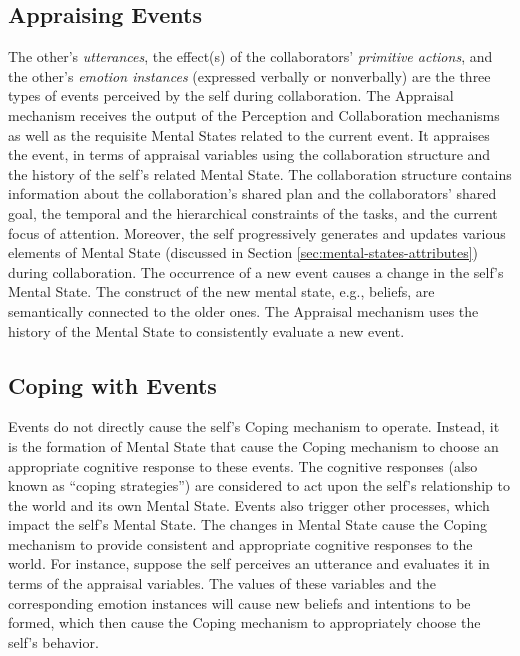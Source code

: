 \documentclass[12pt]{report}
\begin{document}
\subsection{Appraising Events}
\label{sec:appraisal-event}

The other's \textit{utterances}, the effect(s) of the collaborators'
\textit{primitive actions}, and the other's \textit{emotion instances}
(expressed verbally or nonverbally) are the three types of events perceived by
the self during collaboration. The Appraisal mechanism receives the output of
the Perception and Collaboration mechanisms as well as the requisite Mental
States related to the current event. It appraises the event, in terms of
appraisal variables using the collaboration structure and the history of the
self's related Mental State. The collaboration structure contains information
about the collaboration's shared plan and the collaborators' shared goal, the
temporal and the hierarchical constraints of the tasks, and the current focus of
attention. Moreover, the self progressively generates and updates various
elements of Mental State (discussed in Section
\ref{sec:mental-states-attributes}) during collaboration. The occurrence of a
new event causes a change in the self's Mental State. The construct of the new
mental state, e.g., beliefs, are semantically connected to the older ones. The
Appraisal mechanism uses the history of the Mental State to consistently
evaluate a new event.

\subsection{Coping with Events}

Events do not directly cause the self's Coping mechanism to operate. Instead, it
is the formation of Mental State that cause the Coping mechanism to choose an
appropriate cognitive response to these events. The cognitive responses (also
known as ``coping strategies'') are considered to act upon the self's
relationship to the world and its own Mental State. Events also trigger other
processes, which impact the self's Mental State. The changes in Mental State
cause the Coping mechanism to provide consistent and appropriate cognitive
responses to the world. For instance, suppose the self perceives an utterance
and evaluates it in terms of the appraisal variables. The values of these
variables and the corresponding emotion instances will cause new beliefs and
intentions to be formed, which then cause the Coping mechanism to appropriately
choose the self's behavior.
\end{document}
